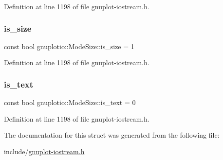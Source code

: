 Definition at line 1198 of file gnuplot-\/iostream.\+h.

\mbox{\label{structgnuplotio_1_1_mode_size_aa20ae9f1ce222504489db33d13eb46c0}} 
\subsubsection{\texorpdfstring{is\+\_\+size}{is\_size}}
{\footnotesize\ttfamily const bool gnuplotio\+::\+Mode\+Size\+::is\+\_\+size = 1\hspace{0.3cm}{\ttfamily [static]}}



Definition at line 1198 of file gnuplot-\/iostream.\+h.

\mbox{\label{structgnuplotio_1_1_mode_size_aa01840f76877ae7c8bad254dae28e32c}} 
\subsubsection{\texorpdfstring{is\+\_\+text}{is\_text}}
{\footnotesize\ttfamily const bool gnuplotio\+::\+Mode\+Size\+::is\+\_\+text = 0\hspace{0.3cm}{\ttfamily [static]}}



Definition at line 1198 of file gnuplot-\/iostream.\+h.



The documentation for this struct was generated from the following file\+:\begin{DoxyCompactItemize}
\item 
include/\hyperlink{gnuplot-iostream_8h}{gnuplot-\/iostream.\+h}\end{DoxyCompactItemize}
